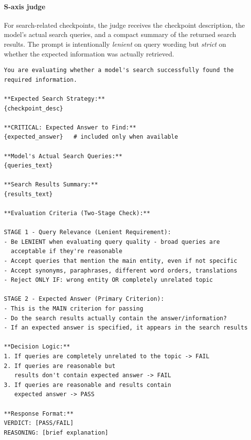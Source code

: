 \documentclass[runningheads]{llncs}
\theoremstyle{plain}
\theoremstyle{definition}
\theoremstyle{remark}
\begin{document}
\paragraph{S-axis judge}
For search-related checkpoints, the judge receives the checkpoint description, the model's actual search queries, and a compact summary of the returned search results. The prompt is intentionally \emph{lenient} on query wording but \emph{strict} on whether the expected information was actually retrieved.

\begin{tcolorbox}[
    enhanced,
    breakable,
    colframe=black!70,
    colback=yellow!5,
    boxrule=1pt, arc=4mm,
    left=2mm, right=2mm, top=1mm, bottom=1mm,
    title={S-axis judge prompt template}
]
\small
\begin{verbatim}
You are evaluating whether a model's search successfully found the
required information.

**Expected Search Strategy:**
{checkpoint_desc}

**CRITICAL: Expected Answer to Find:**
{expected_answer}   # included only when available

**Model's Actual Search Queries:**
{queries_text}

**Search Results Summary:**
{results_text}

**Evaluation Criteria (Two-Stage Check):**

STAGE 1 - Query Relevance (Lenient Requirement):
- Be LENIENT when evaluating query quality - broad queries are
  acceptable if they're reasonable
- Accept queries that mention the main entity, even if not specific
- Accept synonyms, paraphrases, different word orders, translations
- Reject ONLY IF: wrong entity OR completely unrelated topic

STAGE 2 - Expected Answer (Primary Criterion):
- This is the MAIN criterion for passing
- Do the search results actually contain the answer/information?
- If an expected answer is specified, it appears in the search results

**Decision Logic:**
1. If queries are completely unrelated to the topic -> FAIL
2. If queries are reasonable but 
   results don't contain expected answer -> FAIL
3. If queries are reasonable and results contain 
   expected answer -> PASS

**Response Format:**
VERDICT: [PASS/FAIL]
REASONING: [brief explanation]
\end{verbatim}
\end{tcolorbox}
\end{document}
